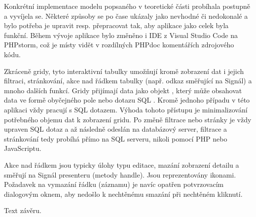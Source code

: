 

Konkrétní implementace modelu popsaného v teoretické části probíhala postupně a vyvíjela se. Některé způsoby se po čase ukázaly jako nevhodné či nedokonalé a bylo potřeba je upravit resp. přepracovat tak, aby aplikace jako celek byla funkční. Během vývoje aplikace bylo změněno i IDE z Visual Studio Code na PHPstorm, což je místy vidět v rozdílných PHPdoc komentářích zdrojového kódu.


\clearpage



\clearpage
{} \label{section:prihlasovani}


\clearpage
{}


\clearpage
{}


 \label{section:zpracovaniHlasu}


 \label{section:Datagridy}
Zkráceně gridy, tyto interaktivní tabulky umožňují kromě zobrazení dat i jejich filtraci, stránkování, akce nad řádkem tabulky (např. odkaz směřující na Signál) a mnoho dalších funkcí. Gridy přijímají data jako objekt , který může obsahovat data ve formě obyčejného pole nebo dotazu SQL \cite{ContributteDataGrid}. Kromě jednoho případu v této aplikaci vždy pracují s SQL dotazem. Výhoda tohoto přístupu je minimalizování potřebného objemu dat k zobrazení gridu. Po změně filtrace nebo stránky je vždy upraven SQL dotaz a až následně odeslán na databázový server, filtrace a stránkování tedy probíhá přímo na SQL serveru, nikoli pomocí PHP nebo JavaScriptu.

Akce nad řádkem jsou typicky úlohy typu editace, mazání zobrazení detailu a směřují na Signál presenteru (metody handle). Jsou reprezentovány ikonami. Požadavek na vymazání řádku (záznamu) je navíc opatřen potvrzovacím dialogovým oknem, aby nedošlo k nechtěnému smazání při nechtěném kliknutí.


Text závěru.


